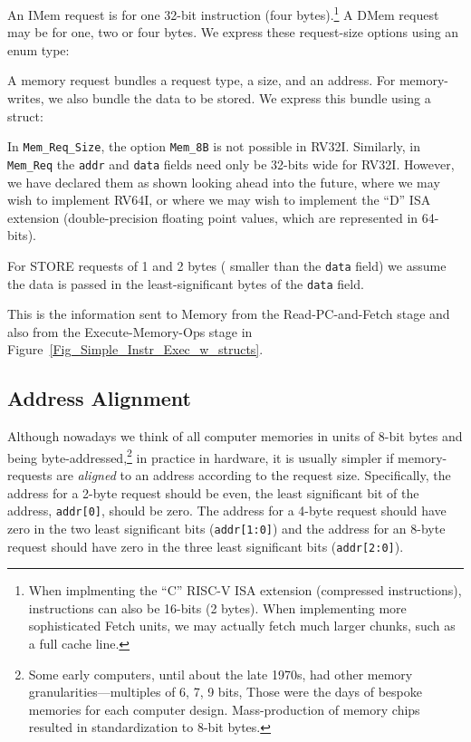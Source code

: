 
An IMem request is for one 32-bit instruction (four
bytes).\footnote{When implmenting the ``C'' RISC-V ISA extension
(compressed instructions), instructions can also be 16-bits (2 bytes).
When implementing more sophisticated Fetch units, we may actually
fetch much larger chunks, such as a full cache line.}  A DMem request
may be for one, two or four bytes.  We express these request-size
options using an enum type:


A memory request bundles a request type, a size, and an address.  For
memory-writes, we also bundle the data to be stored.  We express this
bundle using a struct:


In \verb|Mem_Req_Size|, the option \verb|Mem_8B| is not possible in
RV32I.  Similarly, in \verb|Mem_Req| the \verb|addr| and \verb|data|
fields need only be 32-bits wide for RV32I.  However, we have declared
them as shown looking ahead into the future, where we may wish to
implement RV64I, or where we may wish to implement the ``D'' ISA
extension (double-precision floating point values, which are
represented in 64-bits).

For STORE requests of 1 and 2 bytes ({\ie} smaller than the \verb|data|
field) we assume the data is passed in the least-significant bytes of
the \verb|data| field.

This is the information sent to Memory from the Read-PC-and-Fetch
stage and also from the Execute-Memory-Ops stage in
Figure~\ref{Fig_Simple_Instr_Exec_w_structs}.


\subsection{Address Alignment}


Although nowadays we think of all computer memories in units of 8-bit
bytes and being byte-addressed,\footnote{Some early computers, until
about the late 1970s, had other memory granularities---multiples of 6,
7, 9 bits, {\etc} Those were the days of bespoke memories for each
computer design.  Mass-production of memory chips resulted in
standardization to 8-bit bytes.} in practice in hardware, it is
usually simpler if memory-requests are \emph{aligned} to an address
according to the request size.  Specifically, the address for a 2-byte
request should be even, {\ie} the least significant bit of the
address, \verb|addr[0]|, should be zero.  The address for a 4-byte
request should have zero in the two least significant bits
(\verb|addr[1:0]|) and the address for an 8-byte request should have
zero in the three least significant bits (\verb|addr[2:0]|).


